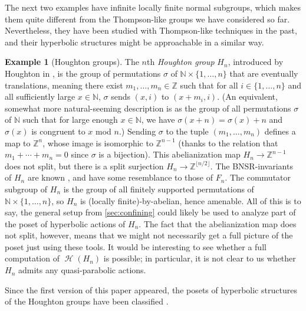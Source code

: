 \documentclass[reqno,12pt]{amsart}\setcounter{tocdepth}{1}
\theoremstyle{definition}
\newtheorem{example}[theorem]{Example}
\newcommand{\N}{\mathbb{N}}
\newcommand{\Z}{\mathbb{Z}}
\DeclareMathOperator{\Hyp}{\mathcal{H}}
\numberwithin{equation}{section}
\begin{document}
The next two examples have infinite locally finite normal subgroups, which makes them quite different from the Thompson-like groups we have considered so far. Nevertheless, they have been studied with Thompson-like techniques in the past, and their hyperbolic structures might be approachable in a similar way. 

\begin{example}[Houghton groups]
The $n$th \emph{Houghton group} $H_n$, introduced by Houghton in \cite{houghton78}, is the group of permutations $\sigma$ of $\N\times\{1,\dots,n\}$ that are eventually translations, meaning there exist $m_1,\dots,m_n\in\Z$ such that for all $i\in\{1,\dots,n\}$ and all sufficiently large $x\in\N$, $\sigma$ sends $(x,i)$ to $(x+m_i,i)$. (An equivalent, somewhat more natural-seeming description is as the group of all permutations $\sigma$ of $\N$ such that for large enough $x\in\N$, we have $\sigma(x+n)=\sigma(x)+n$ and $\sigma(x)$ is congruent to $x$ mod $n$.) Sending $\sigma$ to the tuple $(m_1,\dots,m_n)$ defines a map to $\Z^n$, whose image is isomorphic to $\Z^{n-1}$ (thanks to the relation that $m_1+\cdots+m_n=0$ since $\sigma$ is a bijection). This abelianization map $H_n\to\Z^{n-1}$ does not split, but there is a split surjection $H_n \to \Z^{\lfloor n/2 \rfloor}$. The BNSR-invariants of $H_n$ are known \cite{zaremsky17F_n,zaremsky20}, and have some resemblance to those of $F_n$. The commutator subgroup of $H_n$ is the group of all finitely supported permutations of $\N\times\{1,\dots,n\}$, so $H_n$ is (locally finite)-by-abelian, hence amenable. All of this is to say, the general setup from \cref{sec:confining} could likely be used to analyze part of the poset of hyperbolic actions of $H_n$. The fact that the abelianization map does not split, however, means that we might not necessarily get a full picture of the poset just using these tools. It would be interesting to see whether a full computation of $\Hyp(H_n)$ is possible; in particular, it is not clear to us whether $H_n$ admits any quasi-parabolic actions.
\end{example}

Since the first version of this paper appeared, the posets of hyperbolic structures of the Houghton groups have been classified \cite{houghton_hyp_structures}.
\end{document}
